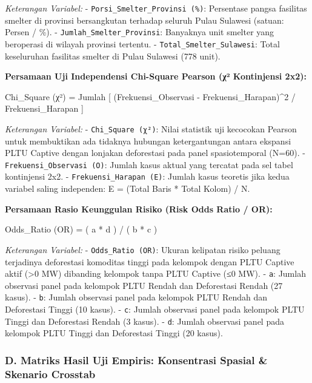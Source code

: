 \documentclass[
]{article}
\newenvironment{Shaded}{}{}
\newcommand{\NormalTok}[1]{#1}
\begin{document}
\emph{Keterangan Variabel:} - \texttt{Porsi\_Smelter\_Provinsi\ (\%)}:
Persentase pangsa fasilitas smelter di provinsi bersangkutan terhadap
seluruh Pulau Sulawesi (satuan: Persen / \%). -
\texttt{Jumlah\_Smelter\_Provinsi}: Banyaknya unit smelter yang
beroperasi di wilayah provinsi tertentu. -
\texttt{Total\_Smelter\_Sulawesi}: Total keseluruhan fasilitas smelter
di Pulau Sulawesi (778 unit).

\textbf{Persamaan Uji Independensi Chi-Square Pearson (χ² Kontinjensi
2x2):}

\begin{Shaded}
\begin{Highlighting}[]
\NormalTok{Chi\_Square (χ²) = Jumlah [ (Frekuensi\_Observasi {-} Frekuensi\_Harapan)\^{}2 / Frekuensi\_Harapan ]}
\end{Highlighting}
\end{Shaded}

\emph{Keterangan Variabel:} - \texttt{Chi\_Square\ (χ²)}: Nilai
statistik uji kecocokan Pearson untuk membuktikan ada tidaknya hubungan
ketergantungan antara ekspansi PLTU Captive dengan lonjakan deforestasi
pada panel spasiotemporal (N=60). - \texttt{Frekuensi\_Observasi\ (O)}:
Jumlah kasus aktual yang tercatat pada sel tabel kontinjensi 2x2. -
\texttt{Frekuensi\_Harapan\ (E)}: Jumlah kasus teoretis jika kedua
variabel saling independen: E = (Total Baris * Total Kolom) / N.

\textbf{Persamaan Rasio Keunggulan Risiko (Risk Odds Ratio / OR):}

\begin{Shaded}
\begin{Highlighting}[]
\NormalTok{Odds\_Ratio (OR) = ( a * d ) / ( b * c )}
\end{Highlighting}
\end{Shaded}

\emph{Keterangan Variabel:} - \texttt{Odds\_Ratio\ (OR)}: Ukuran
kelipatan risiko peluang terjadinya deforestasi komoditas tinggi pada
kelompok dengan PLTU Captive aktif (\textgreater0 MW) dibanding kelompok
tanpa PLTU Captive (≤0 MW). - \texttt{a}: Jumlah observasi panel pada
kelompok PLTU Rendah dan Deforestasi Rendah (27 kasus). - \texttt{b}:
Jumlah observasi panel pada kelompok PLTU Rendah dan Deforestasi Tinggi
(10 kasus). - \texttt{c}: Jumlah observasi panel pada kelompok PLTU
Tinggi dan Deforestasi Rendah (3 kasus). - \texttt{d}: Jumlah observasi
panel pada kelompok PLTU Tinggi dan Deforestasi Tinggi (20 kasus).

\subsubsection{D. Matriks Hasil Uji Empiris: Konsentrasi Spasial \&
Skenario
Crosstab}\label{d.-matriks-hasil-uji-empiris-konsentrasi-spasial-skenario-crosstab}
\end{document}
